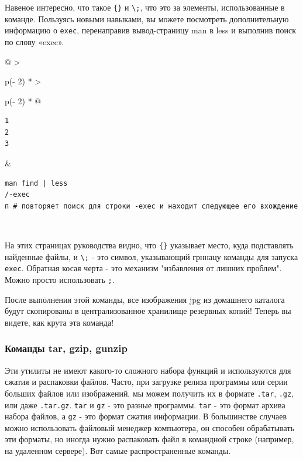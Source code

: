 \documentclass{article}
\begin{document}
Навеное интересно, что такое
\texttt{\textquotesingle{}\{\}\textquotesingle{}} и
\texttt{\textbackslash{};}, что это за элементы, использованные в
команде. Пользуясь новыми навыками, вы можете посмотреть дополнительную
информацию о \texttt{exec}, перенаправив вывод-страницу man в less и
выполнив поиск по слову «exec».

\begin{longtable}[]{@{}
  >{\raggedright\arraybackslash}p{(\columnwidth - 2\tabcolsep) * }
  >{\raggedright\arraybackslash}p{(\columnwidth - 2\tabcolsep) * }@{}}
\toprule
\endhead
\begin{minipage}[t]{\linewidth}\raggedright
\begin{verbatim}
1
2
3
\end{verbatim}
\end{minipage} & \begin{minipage}[t]{\linewidth}\raggedright
\begin{verbatim}
man find | less
/-exec
п # повторяет поиск для строки -exec и находит следующее его вхождение
\end{verbatim}
\end{minipage} \\ \addlinespace
\bottomrule
\end{longtable}

На этих страницах руководства видно, что
\texttt{\textquotesingle{}\{\}\textquotesingle{}} указывает место, куда
подставлять найденные файлы, и \texttt{\textbackslash{};} - это символ,
указывающий грннацу команды для запуска \texttt{exec}. Обратная косая
черта - это механизм "избавления от лишних проблем". Можно просто
использовать \texttt{\textquotesingle{};\textquotesingle{}}.

После выполнения этой команды, все изображения jpg из домашнего каталога
будут скопированы в централизованное хранилище резервных копий! Теперь
вы видете, как крута эта команда!

\hypertarget{tar-gzip-gunzip}{%
\subsubsection{\texorpdfstring{\protect\hyperlink{tar-gzip-gunzip}{}Команды
tar, gzip, gunzip}{Команды tar, gzip, gunzip}}\label{tar-gzip-gunzip}}

Эти утилиты не имеют какого-то сложного набора функций и используются
для сжатия и распаковки файлов. Часто, при загрузке релиза программы или
серии больших файлов или изображений, мы можем получить их в формате
\texttt{.tar}, \texttt{.gz}, или даже \texttt{.tar.gz}. \texttt{tar} и
\texttt{gz} - это разные программы. \texttt{tar} - это формат архива
набора файлов, а \texttt{gz} - это формат сжатия информации. В
большинстве случаев можно использовать файловый менеджер компьютера, он
способен обрабатывать эти форматы, но иногда нужно распаковать файл в
командной строке (например, на удаленном сервере). Вот самые
распространенные команды.
\end{document}
